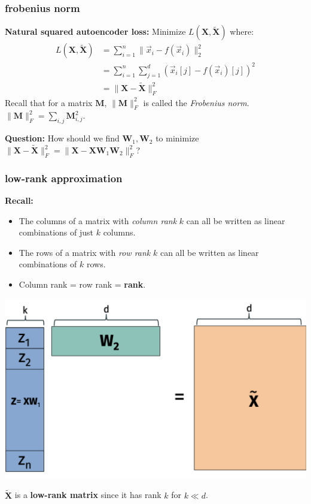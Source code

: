 \documentclass[handout,compress]{beamer}
\newcommand{\bv}[1]{\mathbf{#1}}
\begin{document}
\begin{frame}
	\frametitle{frobenius norm}
	\textbf{Natural squared autoencoder loss:} Minimize $L(\bv{X}, \tilde{\bv{X}})$ where:
	\begin{align*}
	L(\bv{X}, \tilde{\bv{X}}) &= \sum_{i=1}^n \|\vec{x}_i - f(\vec{x}_i)\|_2^2\\
	&= \sum_{i=1}^n \sum_{j=1}^d (\vec{x}_i[j] - f(\vec{x}_i)[j])^2\\
	&= \|\bv{X} - \tilde{\bv{X}}\|_F^2
	\end{align*}
	Recall that for a matrix $\bv{M}$, $\|\bv{M}\|_F^2$ is called the \emph{Frobenius norm}. $\|\bv{M}\|_F^2 = \sum_{i,j} \bv{M}_{i,j}^2$.
	
	\textbf{Question:} How should we find $\bv{W}_1, \bv{W}_2$ to minimize $\|\bv{X} - \tilde{\bv{X}}\|_F^2 = \|\bv{X} - \bv{X}\bv{W}_1\bv{W}_2\|_F^2$?
\end{frame}

\begin{frame}
	\frametitle{low-rank approximation}
	\small
	\textbf{Recall:} \vspace{-.5em}
	
	\begin{itemize}
		\item The columns of a matrix with \emph{column rank} $k$ can all be written as linear combinations of just $k$ columns.\vspace{-.25em}
		\item The rows of a matrix with \emph{row rank} $k$ can all be written as linear combinations of $k$ rows.\vspace{-.25em}
		\item  Column rank = row rank = \textbf{rank}.\vspace{-.25em}
	\end{itemize} 
\vspace{-1em}
	\begin{center}
		\includegraphics[width=.6\textwidth]{lowranktilde.png}
		
		$\tilde{\bv{X}}$ is a \alert{\textbf{low-rank matrix}} since it has rank $k$ for $k \ll d$.
	\end{center}
\end{frame}
\end{document}
